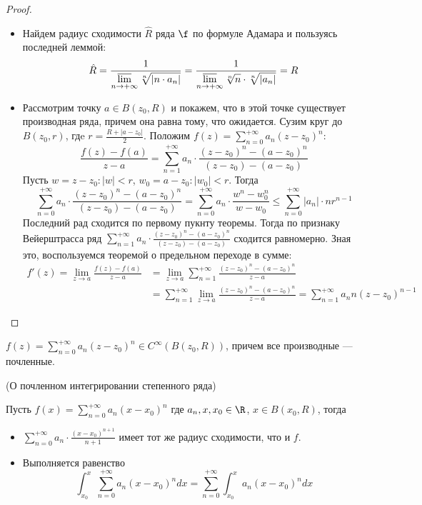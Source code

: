 \begin{proof}
    \enewline
    \begin{itemize}
        \item Найдем радиус сходимости $\hat{R}$ ряда $\f$ по формуле Адамара и
        пользуясь последней леммой:
\[
    \hat{R} = \frac{1}{\displaystyle \varlimsup_{n \to +\infty}{\sqrt[n]{|n
    \cdot a_n|}}} = \frac{1}{\displaystyle \varlimsup_{n \to
    +\infty}{\sqrt[n]{n} \cdot \sqrt[n]{|a_n|}}} = R
\]
        \item Рассмотрим точку $a \in B(z_0, R)$ и покажем, что в этой точке
        существует производная ряда, причем она равна тому, что ожидается.
        Сузим круг до $B(z_0, r)$, гдe $r = \frac{R + |a - z_0|}{2}$.
        Положим $\displaystyle f(z) = \sum_{n = 0}^{+\infty}{a_n(z - z_0)^n}$:
\[
    \frac{f(z) - f(a)}{z - a} = \sum_{n = 1}^{+\infty}{a_n \cdot
    \frac{(z - z_0)^n - (a - z_0)^n}{(z - z_0) - (a - z_0)}}
\]
    Пусть $w = z - z_0: |w| < r$, $w_0 = a - z_0: |w_0| < r$. Тогда
\[
    \sum_{n = 0}^{+\infty}{a_n \cdot \frac{(z - z_0)^n - (a - z_0)^n}{(z - z_0)
    - (a - z_0)}}
    = \sum_{n = 0}^{+\infty}{a_n \cdot \frac{w^n - w^n_0}{w - w_0}}
    \leqslant \sum_{n = 0}^{+\infty}{|a_n| \cdot nr^{n - 1}}
\]
    Последний рад сходится по первому пукнту теоремы. Тогда по признаку
    Вейерштрасса ряд $\displaystyle \sum_{n = 1}^{+\infty}{a_n \cdot
    \frac{(z - z_0)^n - (a - z_0)^n}{(z - z_0) - (a - z_0)}}$
    сходится равномерно. Зная это, воспользуемся теоремой о предельном переходе
    в сумме:
\begin{align*}
    f'(z) = \lim_{z \to a}{\frac{f(z) - f(a)}{z - a}} &= \lim_{z \to a}
    {\sum_{n = 1}^{+\infty}{\frac{(z - z_0)^n - (a - z_0)^n}{z - a}}}
    \\ &= \sum_{n = 1}^{+\infty}{\lim_{z \to a}{\frac{(z - z_0)^n - (a -
    z_0)^n}{z - a}}} = \sum_{n = 1}^{+\infty}{a_n n(z - z_0)^{n - 1}}
\end{align*}
    \end{itemize}
\end{proof}

\begin{corollary}
    $\displaystyle f(z) = \sum_{n = 0}^{+\infty}{a_n(z - z_0)^n} \in
    C^{\infty}(B(z_0, R))$, причем все производные --- почленные.
\end{corollary}

\begin{corollary}(О почленном интегрировании степенного ряда)

    Пусть $f(x) = \displaystyle \sum_{n = 0}^{+\infty}{a_n (x - x_0)^n}$ где
    $a_n, x, x_0 \in \R$, $x \in B(x_0, R)$, тогда
\begin{itemize}
    \item $\displaystyle \sum_{n = 0}^{+\infty}{a_n \cdot \frac{(x - x_0)^{n +
    1}}{n + 1}}$ имеет тот же радиус сходимости, что и $f$.
    \item Выполняется равенство
\[
    \int_{x_0}^{x}{\sum_{n = 0}^{+\infty}{a_n (x - x_0)^n} dx}
    = \sum_{n = 0}^{+\infty}{\int_{x_0}^{x}{a_n(x - x_0)^n dx}}
\]
\end{itemize}
\end{corollary}


